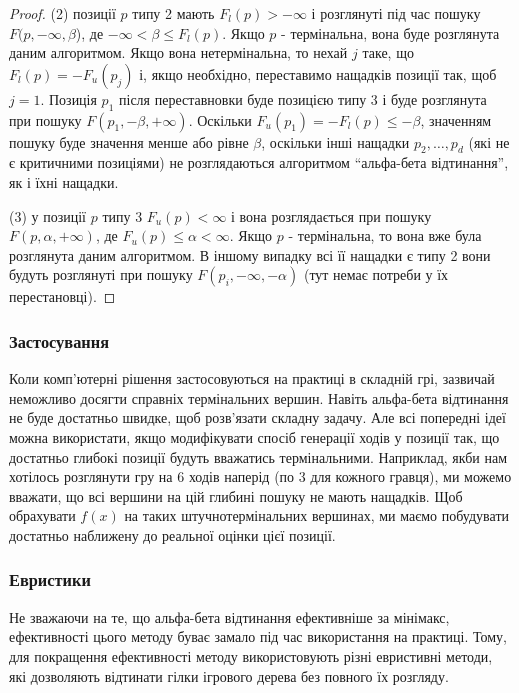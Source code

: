 \documentclass[12pt,a4paper]{article}
\begin{document}
\begin{proof}
  (2) позиції $p$ типу 2 мають $F_l(p) > -\infty$ і розглянуті під час
  пошуку $F(p, -\infty, \beta$), де $-\infty < \beta \le F_l(p)$. Якщо $p$ -
  термінальна, вона буде розглянута даним алгоритмом. Якщо вона нетермінальна,
  то нехай $j$ таке, що $F_l(p)=-F_u(p_j)$ і, якщо необхідно, переставимо
  нащадків позиції так, щоб $j=1$. Позиція $p_1$ після переставновки буде
  позицією типу 3 і буде розглянута при пошуку $F(p_1, -\beta,
  +\infty)$. Оскільки $F_u(p_1)=-F_l(p)\le -\beta$, значенням пошуку буде
  значення менше або рівне $\beta$, оскільки інші нащадки $p_2,\dots,p_d$ (які
  не є критичними позиціями) не розглядаються алгоритмом ``альфа-бета
  відтинання'', як і їхні нащадки.

  (3) у позиції $p$ типу 3 $F_u(p) < \infty$ і вона розглядається при пошуку
  $F(p, \alpha, +\infty)$, де $F_u(p)\le\alpha < \infty$. Якщо $p$ -
  термінальна, то вона вже була розглянута даним алгоритмом. В іншому випадку
  всі її нащадки є типу 2 вони будуть розглянуті при пошуку $F(p_i, -\infty,
  -\alpha)$ (тут немає потреби у їх перестановці).
\end{proof}

\subsubsection{Застосування}
Коли комп'ютерні рішення застосовуються на практиці в складній грі, зазвичай
неможливо досягти справніх термінальних вершин. Навіть альфа-бета відтинання
не буде достатньо швидке, щоб розв'язати складну задачу. Але всі попередні
ідеї можна використати, якщо модифікувати спосіб генерації ходів у позиції
так, що достатньо глибокі позиції будуть вважатись термінальними. Наприклад,
якби нам хотілось розглянути гру на 6 ходів наперід (по 3 для кожного гравця),
ми можемо вважати, що всі вершини на цій глибині пошуку не мають нащадків. Щоб
обрахувати $f(x)$ на таких штучнотермінальних вершинах, ми маємо побудувати
достатньо наближену до реальної оцінки цієї позиції.

\subsubsection{Евристики}
Не зважаючи на те, що альфа-бета відтинання ефективніше за мінімакс,
ефективності цього методу буває замало під час використання на практиці. Тому,
для покращення ефективності методу використовують різні евристивні методи, які
дозволяють відтинати гілки ігрового дерева без повного їх розгляду.
\end{document}
